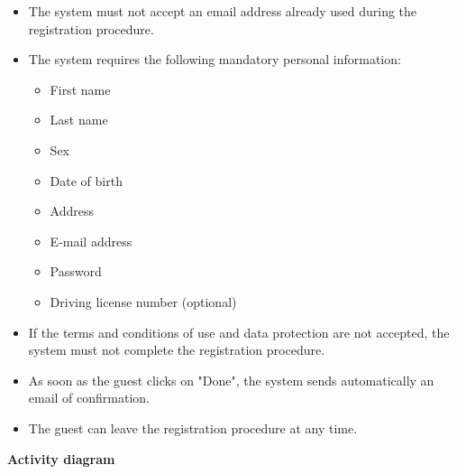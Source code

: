 \documentclass{article}
\begin{document}
	\begin{itemize}
		\item The system must not accept an email address already used during the registration procedure.
		\item The system requires the following mandatory personal information:
			\begin{itemize}
				\item First name
				\item Last name
				\item Sex
				\item Date of birth
				\item Address
				\item E-mail address
				\item Password
				\item Driving license number (optional)
			\end{itemize}
		\item If the terms and conditions of use and data protection are not accepted, the system must not complete the registration procedure.
		\item As soon as the guest clicks on "Done", the system sends automatically an email of confirmation.
		\item The guest can leave the registration procedure at any time.
	\end{itemize}

	\newpage
	\noindent
	\textbf{Activity diagram} \\
\end{document}
